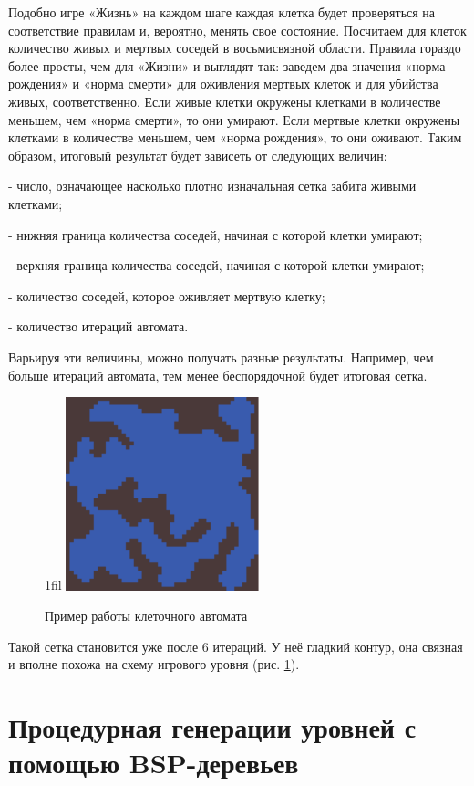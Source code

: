 \documentclass[a4paper,12pt]{report}
\makeatletter
\theoremstyle{remark}
\newcommand*{\centerfloat}{%
  \parindent \z@
  \leftskip \z@ \@plus 1fil \@minus \textwidth
  \rightskip\leftskip
  \parfillskip \z@skip}
\makeatother
\begin{document}
Подобно игре «Жизнь» на каждом шаге каждая клетка будет проверяться на соответствие правилам и, вероятно, менять свое состояние. Посчитаем для клеток количество живых и мертвых соседей в восьмисвязной области. Правила гораздо более просты, чем для «Жизни» и выглядят так: заведем два значения «норма рождения» и «норма смерти» для оживления мертвых клеток и для убийства живых, соответственно. Если живые клетки окружены клетками в количестве меньшем, чем «норма смерти», то они умирают. Если мертвые клетки окружены клетками в количестве меньшем, чем «норма рождения», то они оживают.
Таким образом, итоговый результат будет зависеть от следующих величин:

- число, означающее насколько плотно изначальная сетка забита живыми клетками;

- нижняя граница количества соседей, начиная с которой клетки умирают;

- верхняя граница количества соседей, начиная с которой клетки умирают;

- количество соседей, которое оживляет мертвую клетку;

- количество итераций автомата.

Варьируя эти величины, можно получать разные результаты. Например, чем больше итераций автомата, тем менее беспорядочной будет итоговая сетка.

\begin{figure}
    \centerfloat
    \includegraphics[width=0.5\textwidth]{levels/1.png}
    \caption{Пример работы клеточного автомата}
    \label{fig:cellular}
\end{figure}

Такой сетка становится уже после 6 итераций. У неё гладкий контур, она связная и вполне похожа на схему игрового уровня (рис. \ref{fig:cellular}).

\section{Процедурная генерации уровней с помощью BSP-деревьев}
\end{document}
